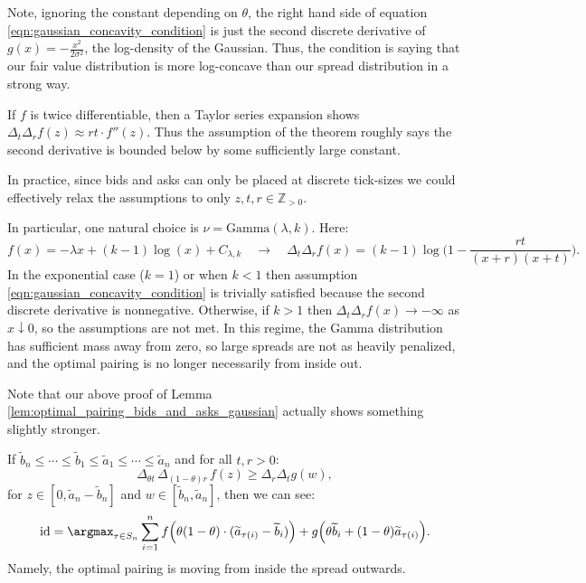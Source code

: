 \noindent Note, ignoring the constant depending on $\theta$, the right hand side of equation \eqref{eqn:gaussian_concavity_condition} is just the second
discrete derivative of $g(x) = -\frac{x^2}{2\sigma^2}$, the log-density of the Gaussian. Thus, the
condition is saying that our fair value distribution is more log-concave than our spread distribution in a strong way.

\begin{remark}
    If $f$ is twice differentiable, then a Taylor series expansion shows
     $\Delta_t \Delta_r f(z) \approx rt \cdot f''(z)$. Thus the
     assumption of the theorem roughly says the second derivative is bounded
     below by some sufficiently large constant.
\end{remark}

\begin{remark}
    In practice, since bids and asks can only be placed at discrete tick-sizes
    we could effectively relax the assumptions to only $z,t,r \in \mathbb{Z}_{> 0}$.
\end{remark}

\begin{example}
    In particular, one natural choice is $\nu = \mathrm{Gamma}(\lambda, k)$. Here:
    \[f(x) = -\lambda x + (k-1) \log(x) + C_{\lambda, k} \quad \to \quad \Delta_t\Delta_r f(x) = (k-1) \log\bigg(1 - \frac{rt}{(x+r)(x+t)}\bigg). \]
    \noindent In the exponential case ($k=1$) or when $k < 1$ then assumption
     \eqref{eqn:gaussian_concavity_condition} is trivially satisfied because
     the second discrete derivative is nonnegative. Otherwise, if $k > 1$ then $\Delta_t \Delta_r f(x) \to - \infty$ as $x \downarrow 0$,
     so the assumptions are not met. In this regime, the Gamma distribution has sufficient mass away from zero, so
     large spreads are not as heavily penalized, and the optimal pairing is no longer necessarily from inside out.
\end{example}

\noindent Note that our above proof of Lemma \ref{lem:optimal_pairing_bids_and_asks_gaussian} actually shows something slightly stronger.

\begin{corollary}
    If $\widetilde b_n \leq \cdots \leq \widetilde b_1 \leq \widetilde a_1 \leq \cdots \leq \widetilde a_n$ and for all $t,r > 0$:
    \[\Delta_{\theta t} \, \Delta_{(1-\theta) r} \, f(z) \geq \Delta_{r} \Delta_{t} g(w),\]
    \noindent for $z \in [0, \widetilde a_n-\widetilde b_n]$ and $w \in [\widetilde b_n,\widetilde a_n]$, then we can see:
    \[\mathrm{id} = \argmax_{\tau \in S_n} \sum_{i=1}^n f\Big(\theta(1-\theta) \cdot (\widetilde a_{\tau(i)} - \widetilde b_i) \Big ) + g\Big(\theta \widetilde b_i + (1-\theta) \widetilde a_{\tau(i)}\Big). \]
    \noindent Namely, the optimal pairing is moving from inside the spread outwards.
        \label{cor:optimal_pairing_bids_and_asks_general}
\end{corollary}


